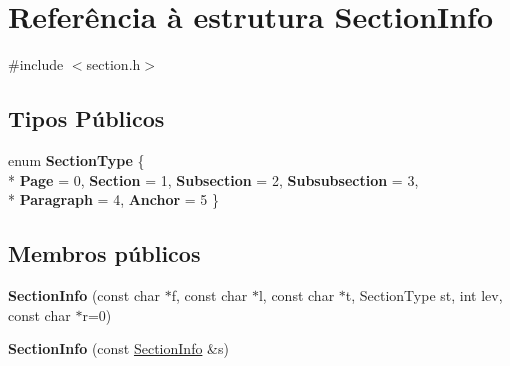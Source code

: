 \hypertarget{struct_section_info}{\section{Referência à estrutura Section\-Info}
\label{struct_section_info}
}


{\ttfamily \#include $<$section.\-h$>$}

\subsection*{Tipos Públicos}
\begin{DoxyCompactItemize}
\item 
enum {\bfseries Section\-Type} \{ \\*
{\bfseries Page} = 0, 
{\bfseries Section} = 1, 
{\bfseries Subsection} = 2, 
{\bfseries Subsubsection} = 3, 
\\*
{\bfseries Paragraph} = 4, 
{\bfseries Anchor} = 5
 \}
\end{DoxyCompactItemize}
\subsection*{Membros públicos}
\begin{DoxyCompactItemize}
\item 
\hypertarget{struct_section_info_a4d2df6d96973a4c9b6840c6c4703d48a}{{\bfseries Section\-Info} (const char $\ast$f, const char $\ast$l, const char $\ast$t, Section\-Type st, int lev, const char $\ast$r=0)}\label{struct_section_info_a4d2df6d96973a4c9b6840c6c4703d48a}

\item 
\hypertarget{struct_section_info_a70da2929a24c48cc4746d887a6480fa4}{{\bfseries Section\-Info} (const \hyperlink{struct_section_info}{Section\-Info} \&s)}\label{struct_section_info_a70da2929a24c48cc4746d887a6480fa4}

\end{DoxyCompactItemize}
